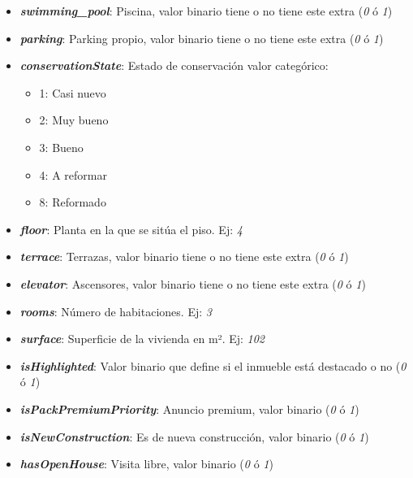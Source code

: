 \begin{itemize}
	\item \textit{\textbf{swimming{\_}pool}}: Piscina, valor binario tiene o no tiene este extra (\textit{0} ó \textit{1})

	\item \textit{\textbf{parking}}: Parking propio, valor binario tiene o no tiene este extra (\textit{0} ó \textit{1})

	\item \textit{\textbf{conservationState}}: Estado de conservación valor categórico:
	\begin{itemize}
            \item 1: Casi nuevo
            \item 2: Muy bueno
            \item 3: Bueno
            \item 4: A reformar
            \item 8: Reformado
      \end{itemize}
	\item \textit{\textbf{floor}}: Planta en la que se sitúa el piso. Ej: \textit{4}

	\item \textit{\textbf{terrace}}: Terrazas, valor binario tiene o no tiene este extra (\textit{0} ó \textit{1})

	\item \textit{\textbf{elevator}}: Ascensores, valor binario tiene o no tiene este extra (\textit{0} ó \textit{1})

	\item \textit{\textbf{rooms}}: Número de habitaciones. Ej: \textit{3}

	\item \textit{\textbf{surface}}: Superficie de la vivienda en m². Ej: \textit{102}

	\item \textit{\textbf{isHighlighted}}: Valor binario que define si el inmueble está destacado o no (\textit{0} ó \textit{1})

	\item \textit{\textbf{isPackPremiumPriority}}: Anuncio premium, valor binario (\textit{0} ó \textit{1})

	\item \textit{\textbf{isNewConstruction}}: Es de nueva construcción, valor binario (\textit{0} ó \textit{1})

	\item \textit{\textbf{hasOpenHouse}}: Visita libre, valor binario (\textit{0} ó \textit{1})


\end{itemize}
